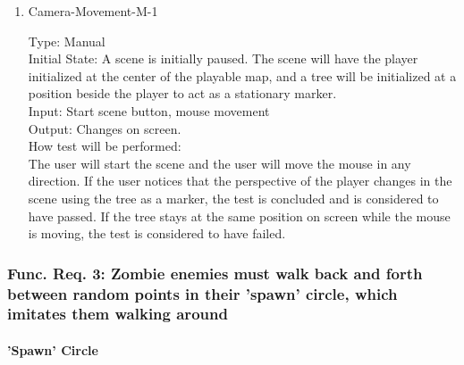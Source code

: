 \documentclass[12pt, titlepage]{article}
\begin{document}
\begin{enumerate}

\item{Camera-Movement-M-1\\}

Type: Manual\\
					
Initial State: A scene is initially paused. The scene will have the player initialized at the center of the playable map, and a tree will be initialized at a position beside the player to act as a stationary marker.\\
					
Input: Start scene button, mouse movement \\
					
Output: Changes on screen. \\
					
How test will be performed:\\ The user will start the scene and the user will move the mouse in any direction. If the user notices that the perspective of the player changes in the scene using the tree as a marker, the test is concluded and is considered to have passed. If the tree stays at the same position on screen while the mouse is moving, the test is considered to have failed. \\

\end{enumerate}

\subsubsection{Func. Req. 3: Zombie enemies must walk back and forth between random points in their 'spawn' circle, which imitates them walking around}
		
\paragraph{'Spawn' Circle}
\end{document}
